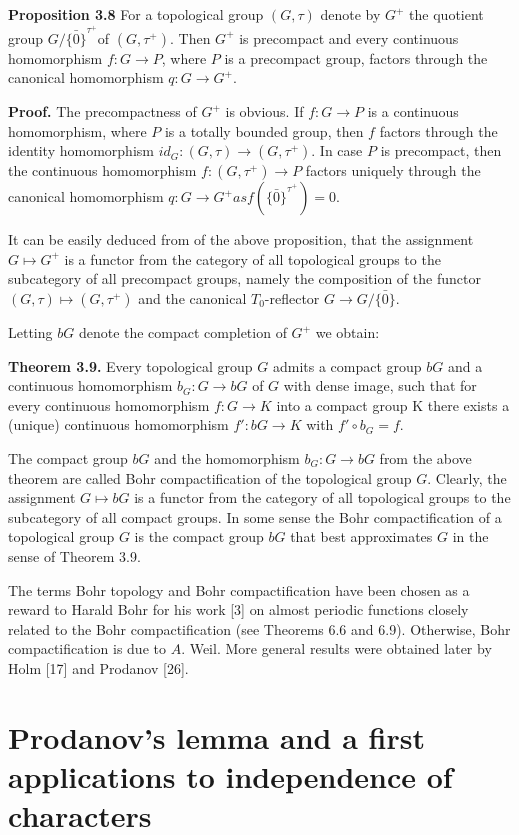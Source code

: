 \documentclass[12pt]{article}
\begin{document}
\textbf{Proposition 3.8} For a topological group $(G, \tau)$ denote by $G^+$ the quotient group $G/\bar{\{0\}}^{\tau^+}$of $(G, \tau^+)$. Then $G^+$ is precompact and
every continuous homomorphism $f : G \to P$, where $P$ is a precompact group, factors through the canonical homomorphism $q : G \to G^+$.


\textbf{Proof.} The precompactness of $G^+$ is obvious. If $f : G \to P$ is a continuous homomorphism, where $P$ is a totally bounded
group, then $f$ factors through the identity homomorphism $id_G :(G, \tau) \to (G, \tau^+)$. In case $P$ is precompact, then the continuous
homomorphism $f :(G, \tau^+) \to P$ factors uniquely through the canonical homomorphism $q : G \to G^+ as f (\bar{\{0\}}^{\tau^+}) = 0$.


    It can be easily deduced from of the above proposition, that the assignment $G \mapsto G^+$ is a functor from the category of
all topological groups to the subcategory of all precompact groups, namely the composition of the functor $(G, \tau) \mapsto (G, \tau^+)$
and the canonical $T_0$-reflector $G \to G/\bar{\{0\}}$.


    Letting $bG$ denote the compact completion of $G^+$ we obtain:


\textbf{Theorem 3.9.} Every topological group $G$ admits a compact group $bG$ and a continuous homomorphism $b_G : G \to bG$ of $G$ with dense
image, such that for every continuous homomorphism $f : G \to K$ into a compact group K there exists a (unique) continuous
homomorphism $f' : bG \to K$ with $f' \circ b_G = f $.


    The compact group $bG$ and the homomorphism $b_G : G \to bG$ from the above theorem are called Bohr compactification
of the topological group $G$. Clearly, the assignment $G \mapsto bG$ is a functor from the category of all topological groups to
the subcategory of all compact groups. In some sense the Bohr compactification of a topological group $G$ is the compact
group $bG$ that best approximates $G$ in the sense of Theorem 3.9.
    

    The terms Bohr topology and Bohr compactification have been chosen as a reward to Harald Bohr for his work [3]
on almost periodic functions closely related to the Bohr compactification (see Theorems 6.6 and 6.9). Otherwise, Bohr
compactification is due to $A$. Weil. More general results were obtained later by Holm [17] and Prodanov [26].


\section{Prodanov's lemma and a first applications to independence of characters}
\end{document}
